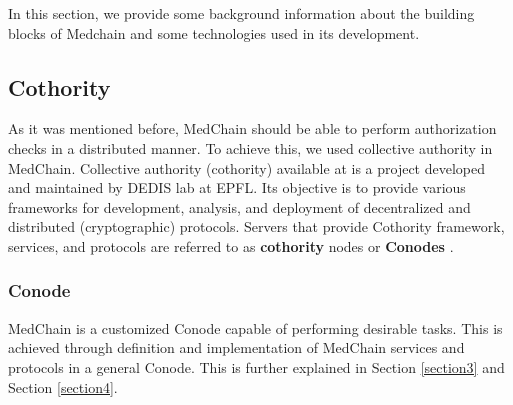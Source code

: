 In this section, we provide some background information about the building blocks of Medchain and some technologies used in its development. 

\subsection{Cothority}\label{cothority}

As it was mentioned before, MedChain should be able to perform authorization checks in a distributed manner. To achieve this, we used collective authority in MedChain. Collective authority (cothority) available at \cite{cothority:2019} is a project developed and maintained by DEDIS lab at EPFL. Its objective is to provide various frameworks for development, analysis, and deployment of decentralized and distributed (cryptographic) protocols. Servers that provide Cothority framework, services, and protocols are referred to as \textbf{cothority} nodes or \textbf{Conodes} \cite{conode:2019}.  


 
 \subsubsection{Conode}\label{background:conode}

MedChain is a customized Conode capable of performing desirable tasks. This is achieved through definition and implementation of MedChain services and protocols in a general Conode. This is further explained in Section \ref{section3} and Section \ref{section4}.



